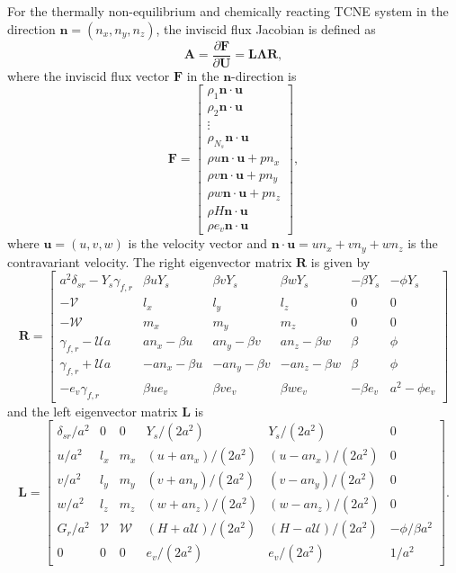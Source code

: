 For the thermally non-equilibrium and chemically reacting \gls{TCNE} system in the direction $\mathbf{n} = (n_x, n_y, n_z)$, the inviscid flux Jacobian is defined as
\begin{equation}
\mathbf{A} = \frac{\partial \mathbf{F}}{\partial \mathbf{U}} = \mathbf{L}\mathbf{\Lambda}\mathbf{R},
\end{equation}
where the inviscid flux vector $\mathbf{F}$ in the $\mathbf{n}$-direction is
\begin{equation}
\mathbf{F} = \begin{bmatrix}
\rho_1 \mathbf{n} \cdot \mathbf{u} \\
\rho_2 \mathbf{n} \cdot \mathbf{u} \\
\vdots \\
\rho_{N_s} \mathbf{n} \cdot \mathbf{u} \\
\rho u \mathbf{n} \cdot \mathbf{u} + p n_x \\
\rho v \mathbf{n} \cdot \mathbf{u} + p n_y \\
\rho w \mathbf{n} \cdot \mathbf{u} + p n_z \\
\rho H \mathbf{n} \cdot \mathbf{u} \\
\rho e_v \mathbf{n} \cdot \mathbf{u}
\end{bmatrix},
\end{equation}
where $\mathbf{u} = (u, v, w)$ is the velocity vector and $\mathbf{n} \cdot \mathbf{u} = un_x + vn_y + wn_z$ is the contravariant velocity. The right eigenvector matrix $\mathbf{R}$ is given by
\begin{equation}
\mathbf{R} = \begin{bmatrix}
a^2\delta_{sr} - Y_s\gamma_{f,r} & \beta u Y_s & \beta v Y_s & \beta w Y_s & -\beta Y_s & -\phi Y_s \\
-\mathcal{V} & l_x & l_y & l_z & 0 & 0 \\
-\mathcal{W} & m_x & m_y & m_z & 0 & 0 \\
\gamma_{f,r} - \mathcal{U}a & a n_x - \beta u & a n_y - \beta v & a n_z - \beta w & \beta & \phi \\
\gamma_{f,r} + \mathcal{U}a & -a n_x - \beta u & -a n_y - \beta v & -a n_z - \beta w & \beta & \phi \\
-e_v\gamma_{f,r} & \beta u e_v & \beta v e_v & \beta w e_v & -\beta e_v & a^2 - \phi e_v
\end{bmatrix}
\end{equation}
and the left eigenvector matrix $\mathbf{L}$ is
\begin{equation}
\mathbf{L} = \begin{bmatrix}
\delta_{sr}/a^2 & 0 & 0 & Y_s/(2a^2) & Y_s/(2a^2) & 0 \\
u/a^2 & l_x & m_x & (u+a n_x)/(2a^2) & (u-a n_x)/(2a^2) & 0 \\
v/a^2 & l_y & m_y & (v+a n_y)/(2a^2) & (v-a n_y)/(2a^2) & 0 \\
w/a^2 & l_z & m_z & (w+a n_z)/(2a^2) & (w-a n_z)/(2a^2) & 0 \\
G_r/a^2 & \mathcal{V} & \mathcal{W} & (H+a\mathcal{U})/(2a^2) & (H-a\mathcal{U})/(2a^2) & -\phi/\beta a^2 \\
0 & 0 & 0 & e_v/(2a^2) & e_v/(2a^2) & 1/a^2
\end{bmatrix}.
\end{equation}
